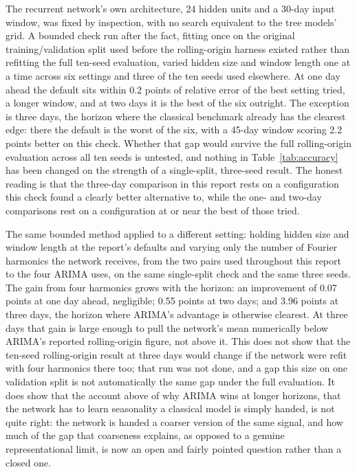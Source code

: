 \documentclass[12pt,a4paper]{report}
\begin{document}
The recurrent network's own architecture, 24 hidden units and a 30-day
input window, was fixed by inspection, with no search equivalent to the
tree models' grid. A bounded check run after the fact, fitting once on
the original training/validation split used before the rolling-origin
harness existed rather than refitting the full ten-seed evaluation, varied
hidden size and window length one at a time across six settings and three
of the ten seeds used elsewhere. At one day ahead the default sits within
0.2 points of relative error of the best setting tried, a longer window,
and at two days it is the best of the six outright. The exception is three
days, the horizon where the classical benchmark already has the clearest
edge: there the default is the worst of the six, with a 45-day window
scoring 2.2 points better on this check. Whether that gap would survive the
full rolling-origin evaluation across all ten seeds is untested, and
nothing in Table~\ref{tab:accuracy} has been changed on the strength of a
single-split, three-seed result. The honest reading is that the three-day
comparison in this report rests on a configuration this check found a
clearly better alternative to, while the one- and two-day comparisons
rest on a configuration at or near the best of those tried.

The same bounded method applied to a different setting: holding hidden
size and window length at the report's defaults and varying only the
number of Fourier harmonics the network receives, from the two pairs used
throughout this report to the four ARIMA uses, on the same single-split
check and the same three seeds. The gain from four harmonics grows with the
horizon: an improvement of 0.07 points at one day ahead, negligible; 0.55
points at two days; and 3.96 points at three days, the horizon where ARIMA's
advantage is otherwise clearest. At three days that gain is large enough to
pull the network's mean numerically below ARIMA's reported rolling-origin
figure, not above it. This does not show that the ten-seed rolling-origin
result at three days would change if the network were refit with four
harmonics there too; that run was not done, and a gap this size on one
validation split is not automatically the same gap under the full
evaluation. It does show that the account above of why ARIMA wins at longer
horizons, that the network has to learn seasonality a classical model is
simply handed, is not quite right: the network is handed a coarser version
of the same signal, and how much of the gap that coarseness explains, as
opposed to a genuine representational limit, is now an open and fairly
pointed question rather than a closed one.
\end{document}
